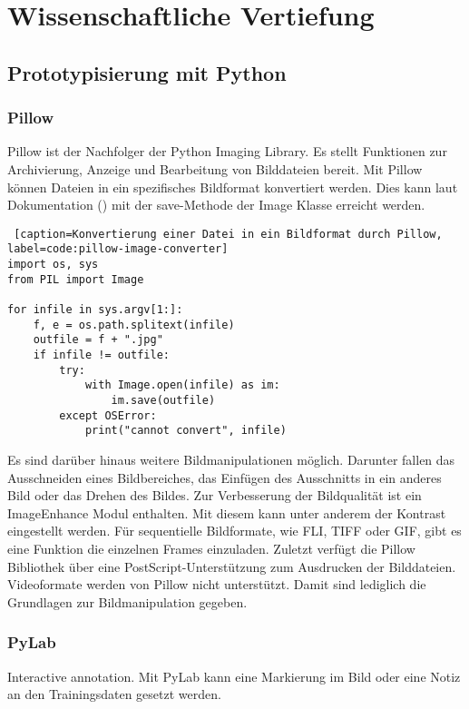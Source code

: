 \chapter{Wissenschaftliche Vertiefung} \label{sec:research}
\section{Prototypisierung mit Python}
\subsection*{Pillow}
Pillow ist der Nachfolger der Python Imaging Library. Es stellt Funktionen zur Archivierung, Anzeige und Bearbeitung von Bilddateien bereit. 
Mit Pillow können Dateien in ein spezifisches Bildformat konvertiert werden. Dies kann laut Dokumentation (\cite[][]{pillow-documentary}) mit der save-Methode der Image Klasse erreicht werden.

\begin{lstlisting} [caption=Konvertierung einer Datei in ein Bildformat durch Pillow, label=code:pillow-image-converter]
import os, sys
from PIL import Image

for infile in sys.argv[1:]:
    f, e = os.path.splitext(infile)
    outfile = f + ".jpg"
    if infile != outfile:
        try:
            with Image.open(infile) as im:
                im.save(outfile)
        except OSError:
            print("cannot convert", infile)
\end{lstlisting}

Es sind darüber hinaus weitere Bildmanipulationen möglich. Darunter fallen das Ausschneiden eines Bildbereiches, das Einfügen des Ausschnitts in ein anderes Bild oder das Drehen des Bildes. Zur Verbesserung der Bildqualität ist ein ImageEnhance Modul enthalten. Mit diesem kann unter anderem der Kontrast eingestellt werden. Für sequentielle Bildformate, wie FLI, TIFF oder GIF, gibt es eine Funktion die einzelnen Frames einzuladen. Zuletzt verfügt die Pillow Bibliothek über eine PostScript-Unterstützung zum Ausdrucken der Bilddateien. 
Videoformate werden von Pillow nicht unterstützt. Damit sind lediglich die Grundlagen zur Bildmanipulation gegeben.

\subsection*{PyLab}
Interactive annotation. Mit PyLab kann eine Markierung im Bild oder eine Notiz an den Trainingsdaten gesetzt werden.

